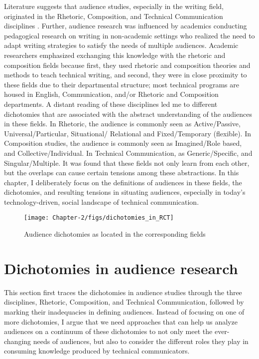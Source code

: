 Literature suggests that audience studies, especially in the writing field, originated in the Rhetoric, Composition, and Technical Communication disciplines \cite{park1982meanings,  breuch2018involving}. Further, audience research was influenced by academics conducting pedagogical research on writing in non-academic settings who realized the need to adapt writing strategies to satisfy the needs of multiple audiences. Academic researchers emphasized exchanging this knowledge with the rhetoric and composition fields because first, they used rhetoric and composition theories and methods to teach technical writing, and second, they were in close proximity to these fields due to their departmental structure; most technical programs are housed in English, Communication, and/or Rhetoric and Composition departments. A distant reading of these disciplines led me to different dichotomies that are associated with the abstract understanding of the audiences in these fields. In Rhetoric, the audience is commonly seen as Active/Passive, Universal/Particular, Situational/ Relational and Fixed/Temporary (flexible). In Composition studies, the audience is commonly seen as Imagined/Role based, and Collective/Individual. In Technical Communication, as Generic/Specific, and Singular/Multiple. It was found that these fields not only learn from each other, but the overlaps can cause certain tensions among these abstractions. In this chapter, I deliberately focus on the definitions of audiences in these fields, the dichotomies, and resulting tensions in situating audiences, especially in today’s technology-driven, social landscape of technical communication.

\begin{figure}[t]
    \begin{center}
        \texttt{[image: Chapter-2/figs/dichotomies\_in\_RCT]}
    \end{center}
    \caption{Audience dichotomies as located in the corresponding fields}
    \label{fig:ch2.1}
\end{figure}

\section{Dichotomies in audience research}
This section first traces the dichotomies in audience studies through the three disciplines, Rhetoric, Composition, and Technical Communication, followed by marking their inadequacies in defining audiences. Instead of focusing on one of more dichotomies, I argue that we need approaches that can help us analyze audiences on a continuum of these dichotomies to not only meet the ever-changing needs of audiences, but also to consider the different roles they play in consuming knowledge produced by technical communicators.


